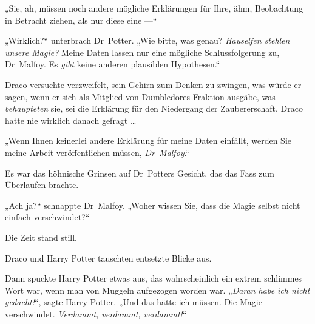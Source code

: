 „Sie, ah, müssen noch andere mögliche Erklärungen für Ihre, ähm, Beobachtung in Betracht ziehen, als nur diese eine —“

„Wirklich?“ unterbrach Dr~Potter.
„Wie bitte, was genau? \emph{Hauselfen stehlen unsere Magie?} Meine Daten lassen nur eine mögliche Schlussfolgerung zu, Dr~Malfoy. Es \emph{gibt} keine anderen plausiblen Hypothesen.“

Draco versuchte verzweifelt, sein Gehirn zum Denken zu zwingen, was würde er sagen, wenn er sich als Mitglied von Dumbledores Fraktion ausgäbe, was \emph{behaupteten} sie, sei die Erklärung für den Niedergang der Zaubererschaft, Draco hatte nie wirklich danach gefragt …

„Wenn Ihnen keinerlei andere Erklärung für meine Daten einfällt, werden Sie meine Arbeit veröffentlichen müssen, \emph{Dr~Malfoy}.“

Es war das höhnische Grinsen auf Dr~Potters Gesicht, das das Fass zum Überlaufen brachte.

„Ach ja?“ schnappte Dr~Malfoy.
„Woher wissen Sie, dass die Magie selbst nicht einfach verschwindet?“

Die Zeit stand still.

Draco und Harry Potter tauschten entsetzte Blicke aus.

Dann spuckte Harry Potter etwas aus, das wahrscheinlich ein extrem schlimmes Wort war, wenn man von Muggeln aufgezogen worden war.
„\emph{Daran habe ich nicht gedacht!}“, sagte Harry Potter.
„Und das hätte ich müssen. Die Magie verschwindet. \emph{Verdammt, verdammt, verdammt!}“

